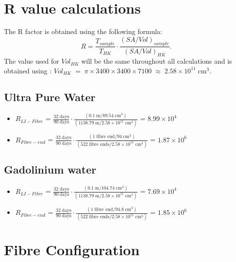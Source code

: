 \documentclass[a4paper,11pt]{article}
\begin{document}
\clearpage
\newpage

\section{R value calculations}
The R factor is obtained using the following formula:
\begin{equation*}
    R=\frac{T_{sample}}{T_{HK}}\cdot \frac{\left(SA/Vol\right)_{sample}}{\left(SA/Vol\right)_{HK}}.\label{eq:R}
\end{equation*}
The value used for $Vol_{HK}$ will be the same throughout all calculations and is obtained using : $Vol_{HK}\;=\; \pi\times3400\times3400\times7100\;\approx\; 2.58\times10^{11}\;\text{cm}^3$.


\subsection{Ultra Pure Water}\label{RCalcUPW}
\begin{itemize}
    \item $R_{LI-Fibre}$ = $\frac{32\;\text{days}}{90\;\text{days}}\cdot \frac{\left(0.1\;\text{m}/89.54\;\text{cm}^3\right)}{\left(1138.79\;\text{m}/2.58\times10^{11}\;\text{cm}^3\right)}$ = $8.99 \times 10^4$
    \item $R_{Fibre-end}$ = $\frac{32\;\text{days}}{90\;\text{days}}\cdot \frac{\left(1\;\text{fibre end}/94\;\text{cm}^3\right)}{\left(522\;\text{fibre ends}/2.58\times10^{11}\;\text{cm}^3\right)}$ = $1.87 \times 10^6$
\end{itemize}

\subsection{Gadolinium water}\label{RCalcGd}
\begin{itemize}
    \item $R_{LI-Fibre}$ = $\frac{32\;\text{days}}{90\;\text{days}}\cdot \frac{\left(0.1\;\text{m}/104.74\;\text{cm}^3\right)}{\left(1138.79\;\text{m}/2.58\times10^{11}\;\text{cm}^3\right)}$ = $7.69 \times 10^4$
    \item $R_{Fibre-end}$ = $\frac{32\;\text{days}}{90\;\text{days}}\cdot \frac{\left(1\;\text{fibre end}/94.8\;\text{cm}^3\right)}{\left(522\;\text{fibre ends}/2.58\times10^{11}\;\text{cm}^3\right)}$ = $1.85 \times 10^6$
\end{itemize}

\clearpage
\newpage

\section{Fibre Configuration}\label{app:fibreconfig}
\end{document}
